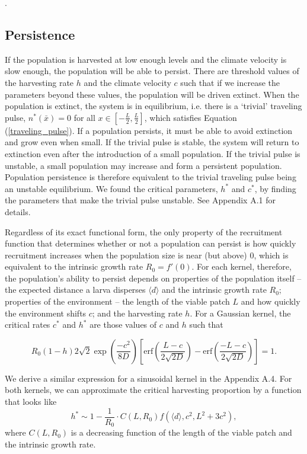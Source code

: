 \documentclass[12pt,english]{article}
\begin{document}
\begin{spacing}{1.9}
\begin{flushleft}
\noindent \citep{Latore:1998fk}.

\subsection{Persistence }
If the population is harvested at low enough levels and the climate velocity is slow enough, the population will be able to persist.  There are threshold values of the harvesting rate $h$ and the climate velocity $c$ such that if we increase the parameters beyond these values, the population will be driven extinct.  When the population is extinct, the system is in equilibrium, i.e. there is a `trivial' traveling pulse, $n^*(\bar{x}) = 0$ for all $x \in \left[-\frac{L}{2}, \frac{L}{2}\right]$, which satisfies Equation (\ref{traveling_pulse}).  If a population persists, it must be able to avoid extinction and grow even when small. If the trivial pulse is stable, the system will return to extinction even after the introduction of a small population. If the trivial pulse is unstable, a small population may increase and form a persistent population. Population persistence is therefore equivalent to the trivial traveling pulse being an unstable equilibrium.  We found the critical parameters, $h^*$ and  $c^*$, by finding the parameters that make the trivial pulse unstable.  See Appendix A.1 for details.

Regardless of its exact functional form, the only property of the recruitment function that determines whether or not a population can persist is how quickly recruitment increases when the population size is near (but above) $0$, which is equivalent to the intrinsic growth rate $R_0=f'(0)$.  For each kernel, therefore, the population's ability to persist depends on properties of the population itself -- the expected distance a larva disperses $\langle d \rangle$ and the intrinsic growth rate $R_0$; properties of the environment -- the length of the viable patch $L$ and how quickly the environment shifts $c$; and the harvesting rate $h$.  
For a Gaussian kernel, the critical rates $c^*$ and $h^*$ are those values of $c$ and $h$ such that 

\[R_0(1-h)2\sqrt{2}\exp\left(\frac{-c^2}{8D}\right)\left[\text{erf}\left(\frac{L-c}{2\sqrt{2D}}\right)-\text{erf}\left(\frac{-L-c}{2\sqrt{2D}}\right)\right]=1.\]

We derive a similar expression for a sinusoidal kernel in the Appendix A.4.  For both kernels, we can approximate the critical harvesting proportion by a function that looks like 
\begin{equation*}
h^*\sim1- \frac{1}{R_0}\cdot C(L,R_0)f(\langle d \rangle,c^2,L^2+3c^2),
\end{equation*}
where $C(L,R_0)$ is a decreasing function of the length of the viable patch and the intrinsic growth rate.
   


\end{flushleft}
\end{spacing}
\end{document}
